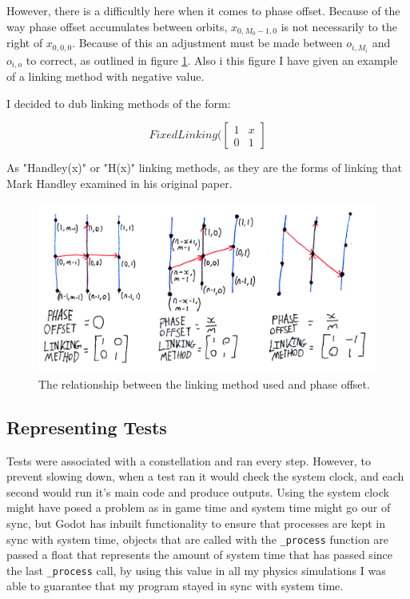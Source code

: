 \documentclass[12pt]{report}
\begin{document}
However, there is a difficultly here when it comes to phase offset. Because of the way phase offset accumulates between orbits, $x_{0,M_0-1,0}$ is not necessarily to the right of $x_{0,0,0}$. Because of this an adjustment must be made between $o_{i,M_i}$ and $o_{i,o}$ to correct, as outlined in figure \ref{Linking Method and Phase Offset}. Also i this figure I have given an example of a linking method with negative value.

I decided to dub linking methods of the form:

\[FixedLinking(\begin{bmatrix} 
1 & x \\
0 & 1\end{bmatrix}\]

As "Handley(x)" or "H(x)" linking methods, as they are the forms of linking that Mark Handley examined in his original paper.

\begin{figure}
	\caption{The relationship between the linking method used and phase offset.}
	\label{Linking Method and Phase Offset}
	\includegraphics[width=\textwidth]{LinkingMethodAndPhaseOffset}
\end{figure}

\subsection{Representing Tests}
Tests were associated with a constellation and ran every step. However, to prevent slowing down, when a test ran it would check the system clock, and each second would run it's main code and produce outputs. Using the system clock might have posed a problem as in game time and system time might go our of sync, but Godot has inbuilt functionality to ensure that processes are kept in sync with system time, objects that are called with the \lstinline{_process} function are passed a float that represents the amount of system time that has passed since the last \lstinline{_process} call, by using this value in all my physics simulations I was able to guarantee that my program stayed in sync with system time.
\end{document}
